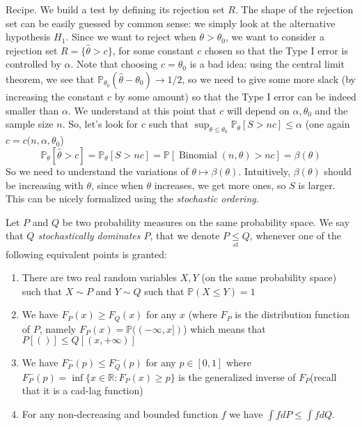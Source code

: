\documentclass[
	fontsize=11pt, %
	twoside=false, %
	numbers=noenddot, %
]{kaobook}
\DeclareMathOperator{\bin}{Binomial}
\renewcommand{\P}{\mathbb P}
\newcommand{\R}{\mathbb R}
\newcommand{\wh}{\widehat}
\newcommand{\goes}{\rightarrow}
\newcommand{\lest}{\underset{st}{\leq}}
\begin{document}
Recipe. We build a test by defining its rejection set $R$. The shape of the rejection set can be easily guessed by common sense: we simply look at the alternative hypothesis $H_1$. 
Since we want to reject when $\theta > \theta_0$, we want to consider a rejection set $R = \{ \wh \theta > c \}$, for some constant $c$ chosen so that the Type I error is controlled by $\alpha$.
Note that choosing $c = \theta_0$ is a bad idea: using the central limit theorem, we see that $\P_{\theta_0}(\wh \theta - \theta_0) \goes 1/2$, so we need to give some more slack (by increasing the constant $c$ by some amount) so that the Type I error can be indeed smaller than $\alpha$.
We understand at this point that $c$ will depend on $\alpha, \theta_0$ and the sample size $n$.
So, let's look for $c$ such that $\sup_{\theta \leq \theta_0} \P_\theta[S > n c] \leq \alpha$ (one again $c = c(n, \alpha, \theta_0$)
\begin{equation*}
	\P_\theta[\wh \theta > c] = \P_\theta[S > n c] = \P [\bin(n, \theta) > nc] = \beta(\theta)
\end{equation*}
So we need to understand the variations of $\theta \mapsto \beta(\theta)$.
Intuitively, $\beta(\theta)$ should be increasing with $\theta$, since when $\theta$ increases, we get more ones, so $S$ is larger.
This can be nicely formalized using the \emph{stochastic ordering}.
\begin{definition}
	Let $P$ and $Q$ be two probability measures on the same probability space. We say that \emph{$Q$ stochastically dominates $P$}, that we denote $P \lest Q$, whenever one of the following equivalent points is granted:
	\begin{enumerate}
		\item There are two real random variables $X, Y$ (on the same probability space) such that $X \sim P$ and $Y \sim Q$ such that $\P(X \leq Y) = 1$
		\item We have $F_P(x) \geq F_Q(x)$ for any $x$ (where $F_P$ is the distribution function of $P$, namely $F_P(x) = \P((-\infty, x])$) which means that $P[()] \leq Q[(x, +\infty)]$
		\item We have $F_P^-(p) \leq F_Q^-(p)$ for any $p \in [0, 1]$ where $F_P^-(p) = \inf \{ x \in \R : F_P(x) \geq p \}$ is the generalized inverse of $F_P$(recall that it is a cad-lag function)
		\item For any non-decreasing and bounded function $f$ we have $\int f dP \leq \int f dQ$.
	\end{enumerate}
\end{definition}
\end{document}

